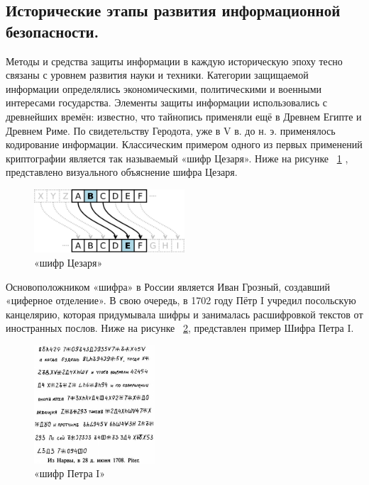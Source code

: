 \subsection{Исторические этапы развития информационной безопасности.}
Методы и средства защиты информации в каждую историческую эпоху тесно связаны с уровнем развития науки и техники. Категории 
защищаемой информации определялись экономическими, политическими и военными интересами государства. Элементы защиты 
информации использовались с древнейших времён: известно, что тайнопись применяли ещё в Древнем Египте и Древнем Риме. По 
свидетельству Геродота, уже в V в. до н. э. применялось кодирование информации. Классическим примером одного из первых 
применений криптографии является так называемый «шифр Цезаря»\cite{urfu}. Ниже на рисунке ~\ref{fig:cez} , представлено визуального объяснение шифра Цезаря.
\begin{figure}[h]
    \centering
    \includegraphics[width=0.5\textwidth]{pic/2.1.png}
    \caption{«шифр Цезаря»}
    \label{fig:cez}
\end{figure}

Основоположником «шифра» в России является Иван Грозный, создавший «циферное отделение». В свою очередь, в 1702 году Пётр I 
учредил посольскую канцелярию, которая придумывала шифры и занималась расшифровкой текстов от иностранных послов. Ниже на рисунке ~\ref{fig:petr}, представлен пример Шифра Петра I.

\begin{figure}[h]
    \centering
    \includegraphics[width=0.4\textwidth]{pic/2.2.jpg}
    \caption{«шифр Петра I»}
    \label{fig:petr}
\end{figure}


